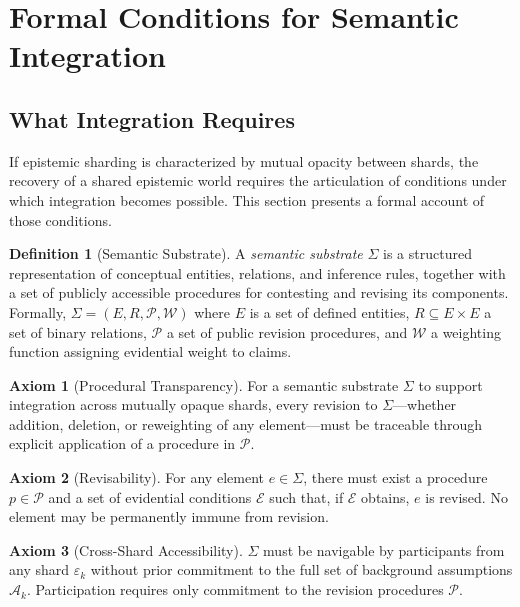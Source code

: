 \documentclass[12pt]{article}
\theoremstyle{definition}
\newtheorem{definition}{Definition}[section]
\newtheorem{axiom}{Axiom}[section]
\theoremstyle{plain}
\begin{document}
\section{Formal Conditions for Semantic Integration}
\label{sec:integration}

\subsection{What Integration Requires}

If epistemic sharding is characterized by mutual opacity between shards, the recovery of a shared epistemic world requires the articulation of conditions under which integration becomes possible. This section presents a formal account of those conditions.

\begin{definition}[Semantic Substrate]
A \emph{semantic substrate} $\Sigma$ is a structured representation of conceptual entities, relations, and inference rules, together with a set of publicly accessible procedures for contesting and revising its components. Formally, $\Sigma = (E, R, \mathcal{P}, \mathcal{W})$ where $E$ is a set of defined entities, $R \subseteq E \times E$ a set of binary relations, $\mathcal{P}$ a set of public revision procedures, and $\mathcal{W}$ a weighting function assigning evidential weight to claims.
\end{definition}

\begin{axiom}[Procedural Transparency]
For a semantic substrate $\Sigma$ to support integration across mutually opaque shards, every revision to $\Sigma$---whether addition, deletion, or reweighting of any element---must be traceable through explicit application of a procedure in $\mathcal{P}$.
\end{axiom}

\begin{axiom}[Revisability]
For any element $e \in \Sigma$, there must exist a procedure $p \in \mathcal{P}$ and a set of evidential conditions $\mathcal{E}$ such that, if $\mathcal{E}$ obtains, $e$ is revised. No element may be permanently immune from revision.
\end{axiom}

\begin{axiom}[Cross-Shard Accessibility]
$\Sigma$ must be navigable by participants from any shard $\varepsilon_k$ without prior commitment to the full set of background assumptions $\mathcal{A}_k$. Participation requires only commitment to the revision procedures $\mathcal{P}$.
\end{axiom}
\end{document}
